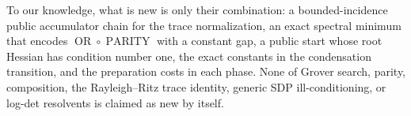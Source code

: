 To our knowledge, what is new is only their combination: a
bounded-incidence public accumulator chain for the trace normalization, an
exact spectral minimum that encodes
$\operatorname{OR}\circ\operatorname{PARITY}$ with a constant gap, a
public start whose root Hessian has condition number one, the exact
constants in the condensation transition, and the preparation costs in each
phase.  None of Grover search, parity, composition, the Rayleigh--Ritz trace
identity, generic SDP ill-conditioning, or log-det resolvents is claimed as
new by itself.
